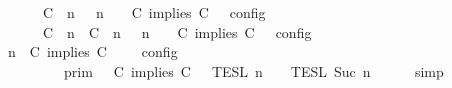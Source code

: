 \begin{isabellebody}
\ \ \ \ \ \ {\isacharequal}\ {\isasymlbrakk}\ {\isacharparenleft}{\isacharparenleft}C\ {\isasymnot}{\isasymUp}\ n{\isacharparenright}\ {\isacharhash}\ {\isasymGamma}{\isacharparenright}{\isacharcomma}\ n\ {\isasymTurnstile}\ {\isasymPsi}\ {\isasymtriangleright}\ {\isacharparenleft}{\isacharparenleft}C\ implies\ C\ {\isacharhash}\ {\isasymPhi}{\isacharparenright}\ {\isasymrbrakk}\isactrlsub c\isactrlsub o\isactrlsub n\isactrlsub f\isactrlsub i\isactrlsub g\isanewline
\ \ \ \ \ \ {\isasymunion}\ {\isasymlbrakk}\ {\isacharparenleft}{\isacharparenleft}C\ {\isasymUp}\ n{\isacharparenright}\ {\isacharhash}\ {\isacharparenleft}C\ {\isasymUp}\ n{\isacharparenright}\ {\isacharhash}\ {\isasymGamma}{\isacharparenright}{\isacharcomma}\ n\ {\isasymTurnstile}\ {\isasymPsi}\ {\isasymtriangleright}\ {\isacharparenleft}{\isacharparenleft}C\ implies\ C\ {\isacharhash}\ {\isasymPhi}{\isacharparenright}\ {\isasymrbrakk}\isactrlsub c\isactrlsub o\isactrlsub n\isactrlsub f\isactrlsub i\isactrlsub g{\isacartoucheclose}\isanewline
%
\isadelimproof
%
\endisadelimproof
%
\isatagproof
{}\isamarkupfalse%
\ {\isacharminus}\isanewline
\ \ \isamarkupfalse%
\ {\isacartoucheopen}{\isasymlbrakk}\ {\isasymGamma}{\isacharcomma}\ n\ {\isasymTurnstile}\ {\isacharparenleft}C\ implies\ C\ {\isacharhash}\ {\isasymPsi}\ {\isasymtriangleright}\ {\isasymPhi}\ {\isasymrbrakk}\isactrlsub c\isactrlsub o\isactrlsub n\isactrlsub f\isactrlsub i\isactrlsub g\isanewline
\ \ \ \ \ \ \ \ {\isacharequal}\ {\isasymlbrakk}{\isasymlbrakk}\ {\isasymGamma}\ {\isasymrbrakk}{\isasymrbrakk}\isactrlsub p\isactrlsub r\isactrlsub i\isactrlsub m\ {\isasyminter}\ {\isasymlbrakk}{\isasymlbrakk}\ {\isacharparenleft}C\ implies\ C\ {\isacharhash}\ {\isasymPsi}\ {\isasymrbrakk}{\isasymrbrakk}\isactrlsub T\isactrlsub E\isactrlsub S\isactrlsub L\isactrlbsup {\isasymge}\ n\isactrlesup \ {\isasyminter}\ {\isasymlbrakk}{\isasymlbrakk}\ {\isasymPhi}\ {\isasymrbrakk}{\isasymrbrakk}\isactrlsub T\isactrlsub E\isactrlsub S\isactrlsub L\isactrlbsup {\isasymge}\ Suc\ n\isactrlesup {\isacartoucheclose}\isanewline
\ \ \ \ \isamarkupfalse%
\ simp\isanewline
\ \ \isamarkupfalse%
\ \isamarkupfalse%

\end{isabellebody}
